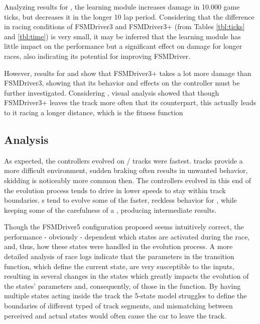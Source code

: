 Analyzing results for , the learning module increases damage in 10.000 game ticks, but decreases it in the longer 10 lap period. Considering that the difference in racing conditions of FSMDriver3 and FSMDriver3+ (from Tables \ref{tbl:ticks} and \ref{tbl:time}) is very small, it may be inferred that the learning module has little impact on the performance but a significant effect on damage for longer races, also indicating its potential for improving FSMDriver.

However, results for  and  show that FSMDriver3+ takes a lot more damage than FSMDriver3, showing that its behavior and effects on the controller must be further investigated. Considering , visual analysis showed that though FSMDriver3+ leaves the track more often that its counterpart, this actually leads to it racing a longer distance, which is the fitness function






\subsection{Analysis}
As expected, the controllers evolved on / tracks were fastest.  tracks provide a more difficult environment, sudden braking often results in unwanted behavior, skidding is noticeably more common then. The controllers evolved in this end of the evolution process tends to drive in lower speeds to stay within track boundaries. s tend to evolve some of the faster, reckless behavior for , while keeping some of the carefulness of a , producing intermediate results.

Though the FSMDriver5 configuration proposed seems intuitively correct, the performance - obviously - dependent which states are activated during the race, and, thus, how these states were handled in the evolution process. A more detailed analysis of race logs indicate that the parameters in the transition function, which define the current state, are very susceptible to the inputs, resulting in several changes in the states which greatly impacts the evolution of the states' parameters and, consequently, of those in the function. By having multiple states acting inside the track the 5-state model struggles to define the boundaries of different typed of track segments, and mismatching between perceived and actual states would often cause the car to leave the track.


